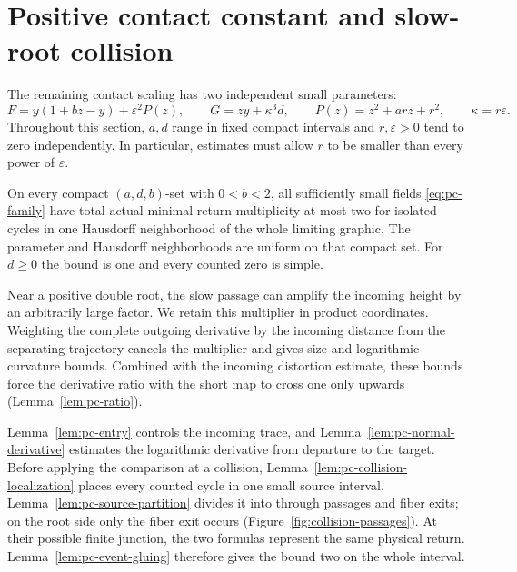\section{Positive contact constant and slow-root collision}
\label{sec:positive-constant}

The remaining contact scaling has two independent small parameters:
\begin{equation}
\label{eq:pc-family}
 F=y(1+bz-y)+\varepsilon^2P(z),\qquad
 G=zy+\kappa^3d,\qquad
 P(z)=z^2+arz+r^2,\qquad \kappa=r\varepsilon.
\end{equation}
Throughout this section, $a,d$ range in fixed compact intervals and
$r,\varepsilon>0$ tend to zero independently. In particular, estimates
must allow $r$ to be smaller than every power of $\varepsilon$.

\begin{proposition}
\label{prop:positive-constant}
On every compact $(a,d,b)$-set with $0<b<2$, all sufficiently small
fields \eqref{eq:pc-family} have total actual minimal-return multiplicity
at most two for isolated cycles in one Hausdorff neighborhood of the
whole limiting graphic. The parameter
and Hausdorff neighborhoods are uniform on that compact set.
For $d\ge0$ the bound is one and every counted zero is simple.
\end{proposition}

Near a positive double root, the slow passage can amplify the incoming
height by an arbitrarily large factor. We retain this multiplier in
product coordinates. Weighting the complete outgoing derivative by the
incoming distance from the separating trajectory cancels the multiplier
and gives size and logarithmic-curvature bounds. Combined with the
incoming distortion estimate, these bounds force the derivative ratio
with the short map to cross one only upwards
(Lemma~\ref{lem:pc-ratio}).

Lemma~\ref{lem:pc-entry} controls the incoming trace, and
Lemma~\ref{lem:pc-normal-derivative} estimates the logarithmic derivative
from departure to the target. Before applying the comparison at a
collision, Lemma~\ref{lem:pc-collision-localization} places every counted
cycle in one small source interval. Lemma~\ref{lem:pc-source-partition}
divides it into through passages and fiber exits; on the root side only
the fiber exit occurs (Figure~\ref{fig:collision-passages}). At their
possible finite junction, the two formulas represent the same physical
return. Lemma~\ref{lem:pc-event-gluing} therefore gives the bound two on
the whole interval.

